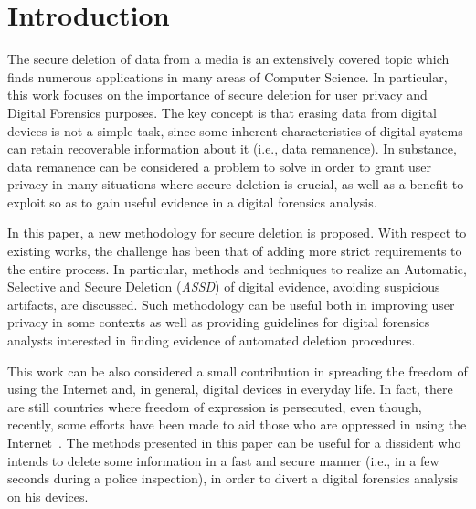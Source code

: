 \documentclass[10pt, conference, compsocconf]{IEEEtran}
\newcommand{\assd}{\emph{ASSD}\xspace}
\begin{document}
\IEEEpeerreviewmaketitle


\section{Introduction}
\label{intro}
The secure deletion of data from a media is an extensively covered topic which finds numerous applications in many areas of Computer Science. In particular, this work focuses on the importance of secure deletion for user privacy and Digital Forensics purposes. The key concept is that erasing data from digital devices is not a simple task, since some inherent characteristics of digital systems can retain recoverable information about it (i.e., data remanence).
In substance, data remanence can be considered a problem to solve in order to grant user privacy in many situations where secure deletion is crucial, as well as a benefit to exploit so as to gain useful evidence in a digital forensics analysis.

In this paper, a new methodology for secure deletion is proposed. With respect to existing works, the challenge has been that of adding more strict requirements to the entire process. In particular, methods and techniques to realize an Automatic, Selective and Secure Deletion (\assd) of digital evidence, avoiding suspicious artifacts, are discussed. Such methodology can be useful both in improving user privacy in some contexts as well as providing guidelines for digital forensics analysts interested in finding evidence of automated deletion procedures.

This work can be also considered a small contribution in spreading the freedom of using the Internet and, in general, digital devices in everyday life. In fact, there are still countries where freedom of expression is persecuted, even though, recently, some efforts have been made to aid those who are oppressed in using the Internet~\cite{obama}. The methods presented in this paper can be useful for a dissident who intends to delete some information in a fast and secure manner (i.e., in a few seconds during a police inspection), in order to divert a digital forensics analysis on his devices.
\end{document}
